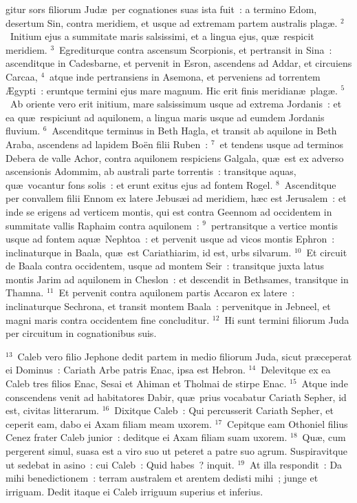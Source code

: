 \bchapter
{}gitur sors filiorum Jud\ae\ per cognationes suas ista fuit~: a termino Edom, desertum Sin, contra meridiem, et usque ad extremam partem australis plag\ae .
${}^{2}$~Initium ejus a summitate maris salsissimi, et a lingua ejus, qu\ae\ respicit meridiem.
${}^{3}$~Egrediturque contra ascensum Scorpionis, et pertransit in Sina~: ascenditque in Cadesbarne, et pervenit in Esron, ascendens ad Addar, et circuiens Carcaa,
${}^{4}$~atque inde pertransiens in Asemona, et perveniens ad torrentem \AE gypti~: eruntque termini ejus mare magnum. Hic erit finis meridian\ae\ plag\ae .
${}^{5}$~Ab oriente vero erit initium, mare salsissimum usque ad extrema Jordanis~: et ea qu\ae\ respiciunt ad aquilonem, a lingua maris usque ad eumdem Jordanis fluvium.
${}^{6}$~Ascenditque terminus in Beth Hagla, et transit ab aquilone in Beth Araba, ascendens ad lapidem Bo\"en filii Ruben~:
${}^{7}$~et tendens usque ad terminos Debera de valle Achor, contra aquilonem respiciens Galgala, qu\ae\ est ex adverso ascensionis Adommim, ab australi parte torrentis~: transitque aquas, qu\ae\ vocantur fons solis~: et erunt exitus ejus ad fontem Rogel.
${}^{8}$~Ascenditque per convallem filii Ennom ex latere Jebus\ae i ad meridiem, h\ae c est Jerusalem~: et inde se erigens ad verticem montis, qui est contra Geennom ad occidentem in summitate vallis Raphaim contra aquilonem~:
${}^{9}$~pertransitque a vertice montis usque ad fontem aqu\ae\ Nephtoa~: et pervenit usque ad vicos montis Ephron~: inclinaturque in Baala, qu\ae\ est Cariathiarim, id est, urbs silvarum.
${}^{10}$~Et circuit de Baala contra occidentem, usque ad montem Seir~: transitque juxta latus montis Jarim ad aquilonem in Cheslon~: et descendit in Bethsames, transitque in Thamna.
${}^{11}$~Et pervenit contra aquilonem partis Accaron ex latere~: inclinaturque Sechrona, et transit montem Baala~: pervenitque in Jebneel, et magni maris contra occidentem fine concluditur.
${}^{12}$~Hi sunt termini filiorum Juda per circuitum in cognationibus suis.


${}^{13}$~Caleb vero filio Jephone dedit partem in medio filiorum Juda, sicut pr\ae ceperat ei Dominus~: Cariath Arbe patris Enac, ipsa est Hebron.
${}^{14}$~Delevitque ex ea Caleb tres filios Enac, Sesai et Ahiman et Tholmai de stirpe Enac.
${}^{15}$~Atque inde conscendens venit ad habitatores Dabir, qu\ae\ prius vocabatur Cariath Sepher, id est, civitas litterarum.
${}^{16}$~Dixitque Caleb~: Qui percusserit Cariath Sepher, et ceperit eam, dabo ei Axam filiam meam uxorem.
${}^{17}$~Cepitque eam Othoniel filius Cenez frater Caleb junior~: deditque ei Axam filiam suam uxorem.
${}^{18}$~Qu\ae , cum pergerent simul, suasa est a viro suo ut peteret a patre suo agrum. Suspiravitque ut sedebat in asino~: cui Caleb~: Quid habes~? inquit.
${}^{19}$~At illa respondit~: Da mihi benedictionem~: terram australem et arentem dedisti mihi~; junge et irriguam. Dedit itaque ei Caleb irriguum superius et inferius.


